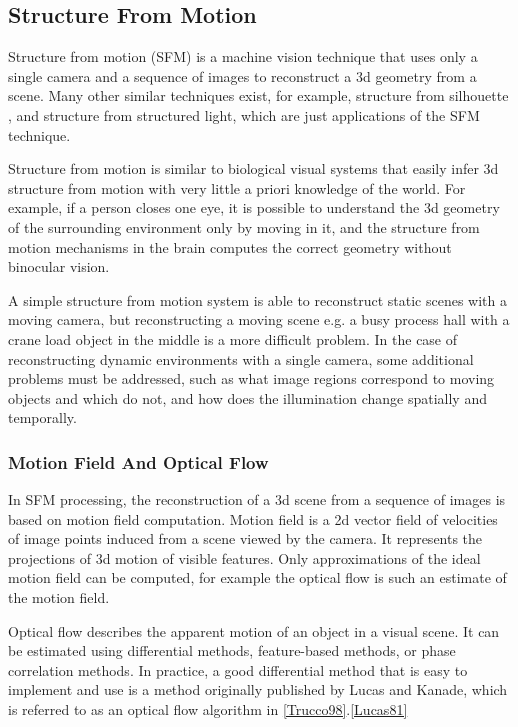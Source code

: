 \documentclass[12pt,a4paper,oneside,pdftex]{report}
\begin{document}
{%

\subsection{Structure From Motion}
\label{subsection:structure_from_motion}

Structure from motion (SFM) is a machine vision technique that uses only a single camera and a sequence of images to  reconstruct a 3d geometry from a scene. Many other similar techniques exist, for example, structure from silhouette
, and structure from structured light, which are just applications of the SFM technique.

Structure from motion is similar to biological visual systems that easily infer 3d structure from motion with very little a priori knowledge of the world. For example, if a person closes one eye, it is possible to understand the 3d geometry of the surrounding environment only by moving in it, and the structure from motion mechanisms in the brain computes the correct geometry without binocular vision.

A simple structure from motion system is able to reconstruct static scenes with a moving camera, but reconstructing a moving scene e.g. a busy process hall with a crane load object in the middle is a more difficult problem. In the case of reconstructing dynamic environments with a single camera, some additional problems must be addressed, such as what image regions correspond to moving objects and which do not, and how does the illumination change spatially and temporally.

\subsubsection{Motion Field And Optical Flow}
\label{subsubsection:motion_field_and_optical_flow}

In SFM processing, the reconstruction of a 3d scene from a sequence of images is based on motion field computation. Motion field is a 2d vector field of velocities of image points induced from a scene viewed by the camera. It represents the projections of 3d motion of visible features. Only approximations of the ideal motion field can be computed, for example the optical flow is such an estimate of the motion field.

Optical flow describes the apparent motion of an object in a visual scene. It can be estimated using differential methods, feature-based methods, or phase correlation methods. In practice, a good differential method that is easy to implement and use is a method originally published by Lucas and Kanade, which is referred to as an optical flow algorithm in \ref{Trucco98}.\ref{Lucas81}

}
\end{document}
